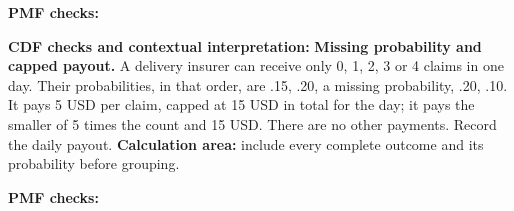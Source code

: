 \hfill%
\begin{minipage}[t]{.60\linewidth}%
  \vspace{0pt}\centering
\end{minipage}%
\par
\textbf{PMF checks:} \hrulefill%
\par
{}
\par%
\noindent%
\begin{minipage}[t]{.37\linewidth}%
  \vspace{0pt}\centering
\end{minipage}%
\hfill%
\begin{minipage}[t]{.60\linewidth}%
  \vspace{0pt}\centering
\end{minipage}%
\par
\textbf{CDF checks and contextual interpretation:}
\vfill
\clearpage
{}
\textbf{Missing probability and capped payout.} A delivery insurer can receive only 0, 1, 2, 3 or 4 claims in
one day. Their probabilities, in that order, are .15, .20, a missing probability, .20, .10. It pays 5 USD per
claim, capped at 15 USD in total for the day; it pays the smaller of 5 times the count and 15 USD. There are
no other payments. Record the daily payout.
\textbf{Calculation area:} include every complete outcome and its probability before grouping.
\par%
\noindent%
\begin{minipage}[t]{.37\linewidth}%
  \vspace{0pt}\centering
\end{minipage}%
\hfill%
\begin{minipage}[t]{.60\linewidth}%
  \vspace{0pt}\centering
\end{minipage}%
\par
\textbf{PMF checks:} \hrulefill%
\par
{}

